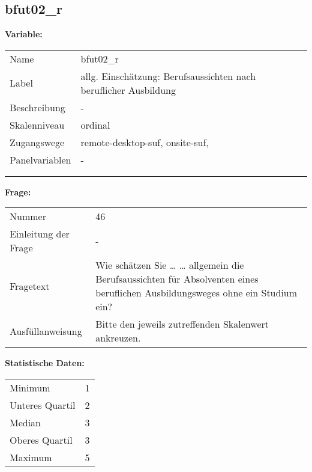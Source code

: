 	
	
	\subsection{bfut02\_r}
	\label{subSection:bfut02_r}

	\noindent\textbf{Variable:}\\
		\begin{tabular}{lL{11.3cm}}
			\label{tableVariable:bfut02_r}
			Name & bfut02\_r \\
			Label & allg. Einschätzung: Berufsaussichten nach beruflicher Ausbildung \\
			Beschreibung & - \\
			Skalenniveau & ordinal \\
			Zugangswege &
				remote-desktop-suf,
				onsite-suf,
 \\
			Panelvariablen & -
			 \\
			 \\
 \\
		\end{tabular}

		\vspace*{1 cm}
		\noindent\textbf{Frage:}\\
		\begin{tabular}{lL{11.3cm}}
			\label{tableQuestion:bfut02_r}
			Nummer & 46 \\
			Einleitung der Frage & - \\
			Fragetext & Wie schätzen Sie …
… allgemein die Berufsaussichten für Absolventen eines beruflichen Ausbildungsweges ohne ein Studium ein? \\
			Ausfüllanweisung & Bitte den jeweils zutreffenden Skalenwert ankreuzen. \\
		\end{tabular}


		\vspace*{1 cm}
		\noindent\textbf{Statistische Daten:}\\
			\begin{tabular}{ll}
				\label{tableStatistics:bfut02_r}
					Minimum & 1 \\
					Unteres Quartil & 2 \\
					Median & 3 \\
					Oberes Quartil & 3 \\
					Maximum & 5 \\
			\end{tabular}



